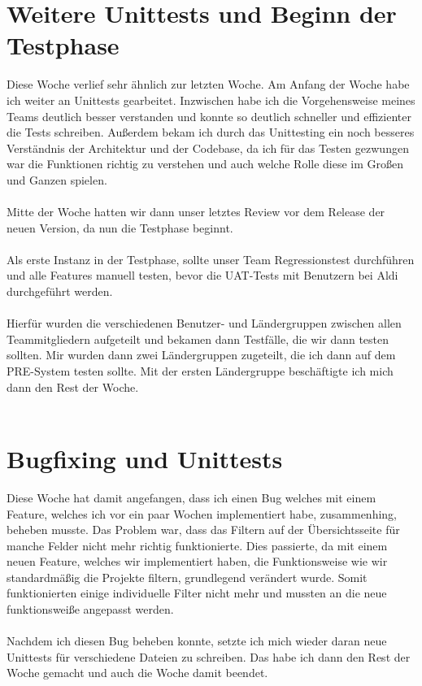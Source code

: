 \section{Weitere Unittests und Beginn der Testphase}
Diese Woche verlief sehr ähnlich zur letzten Woche. Am Anfang der Woche habe ich weiter an Unittests gearbeitet. Inzwischen habe ich die Vorgehensweise meines Teams deutlich besser verstanden und konnte so deutlich schneller und effizienter die Tests schreiben. Außerdem bekam ich durch das Unittesting ein noch besseres Verständnis der Architektur und der Codebase, da ich für das Testen gezwungen war die Funktionen richtig zu verstehen und auch welche Rolle diese im Großen und Ganzen spielen. \\\\
Mitte der Woche hatten wir dann unser letztes Review vor dem Release der neuen Version, da nun die Testphase beginnt.  \\\\
Als erste Instanz in der Testphase, sollte unser Team Regressionstest durchführen und alle Features manuell testen, bevor die UAT-Tests mit Benutzern bei Aldi durchgeführt werden. \\\\
Hierfür wurden die verschiedenen Benutzer- und Ländergruppen zwischen allen Teammitgliedern aufgeteilt und bekamen dann Testfälle, die wir dann testen sollten. Mir wurden dann zwei Ländergruppen zugeteilt, die ich dann auf dem PRE-System testen sollte. Mit der ersten Ländergruppe beschäftigte ich mich dann den Rest der Woche. \\\\

\section{Bugfixing und Unittests}
Diese Woche hat damit angefangen, dass ich einen Bug welches mit einem Feature, welches ich vor ein paar Wochen implementiert habe, zusammenhing, beheben musste. Das Problem war, dass das Filtern auf der Übersichtsseite für manche Felder nicht mehr richtig funktionierte. Dies passierte, da mit einem neuen Feature, welches wir implementiert haben, die Funktionsweise wie wir standardmäßig die Projekte filtern, grundlegend verändert wurde. Somit funktionierten einige individuelle Filter nicht mehr und mussten an die neue funktionsweiße angepasst werden. \\\\
Nachdem ich diesen Bug beheben konnte, setzte ich mich wieder daran neue Unittests für verschiedene Dateien zu schreiben. Das habe ich dann den Rest der Woche gemacht und auch die Woche damit beendet. \\\\

